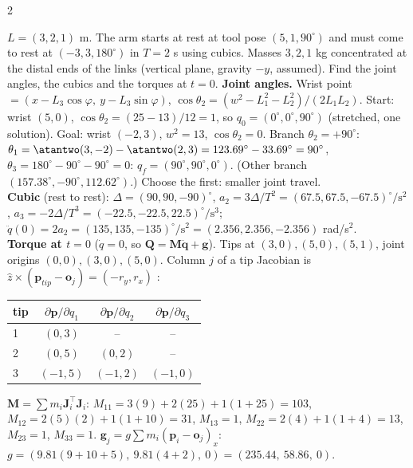\begin{multicols}{2}
\begin{examq}
$L=(3,2,1)$ m. The arm starts at rest at tool pose $(5,1,90^\circ)$ and must come to rest at $(-3,3,180^\circ)$ in $T=2$ s using cubics. Masses $3,2,1$ kg concentrated at the distal ends of the links (vertical plane, gravity $-y$, assumed). Find the joint angles, the cubics and the torques at $t=0$.
\solution
\textbf{Joint angles.} Wrist point $=(x-L_3\cos\varphi,\ y-L_3\sin\varphi)$, $\cos\theta_2=(w^2-L_1^2-L_2^2)/(2L_1L_2)$. Start: wrist $(5,0)$, $\cos\theta_2=(25-13)/12=1$, so $q_0=(0^\circ,0^\circ,90^\circ)$ (stretched, one solution). Goal: wrist $(-2,3)$, $w^2=13$, $\cos\theta_2=0$. Branch $\theta_2=+90^\circ$: $\theta_1=\atantwo(3,-2)-\atantwo(2,3)=123.69^\circ-33.69^\circ=90^\circ$, $\theta_3=180^\circ-90^\circ-90^\circ=0$: $q_f=(90^\circ,90^\circ,0^\circ)$. (Other branch $(157.38^\circ,-90^\circ,112.62^\circ)$.) Choose the first: smaller joint travel.\\
\textbf{Cubic} (rest to rest): $\Delta=(90,90,-90)^\circ$, $a_2=3\Delta/T^2=(67.5,67.5,-67.5)^\circ/\text{s}^2$, $a_3=-2\Delta/T^3=(-22.5,-22.5,22.5)^\circ/\text{s}^3$; $\ddot q(0)=2a_2=(135,135,-135)^\circ/\text{s}^2=(2.356,2.356,-2.356)$ rad/s$^2$.\\
\textbf{Torque at $t=0$} ($\dot q=0$, so $\mathbf Q=\mathbf M\ddot{\mathbf q}+\mathbf g$). Tips at $(3,0),(5,0),(5,1)$, joint origins $(0,0),(3,0),(5,0)$. Column $j$ of a tip Jacobian is $\hat z\times(\mathbf p_{tip}-\mathbf o_j)=(-r_y,r_x)$ \added:
\begin{center}\small\begin{tabular}{@{}lccc@{}}\toprule tip & $\partial\mathbf p/\partial q_1$ & $\partial\mathbf p/\partial q_2$ & $\partial\mathbf p/\partial q_3$\\\midrule
1 & $(0,3)$ & -- & --\\ 2 & $(0,5)$ & $(0,2)$ & --\\ 3 & $(-1,5)$ & $(-1,2)$ & $(-1,0)$\\\bottomrule\end{tabular}\end{center}
$\mathbf M=\sum m_i\mathbf J_i^\top\mathbf J_i$: $M_{11}=3(9)+2(25)+1(1+25)=103$, $M_{12}=2(5)(2)+1(1+10)=31$, $M_{13}=1$, $M_{22}=2(4)+1(1+4)=13$, $M_{23}=1$, $M_{33}=1$. $\mathbf g_j=g\sum m_i(\mathbf p_i-\mathbf o_j)_x$: $g=(9.81(9+10+5),\ 9.81(4+2),\ 0)=(235.44,\ 58.86,\ 0)$.

\end{examq}
\end{multicols}
